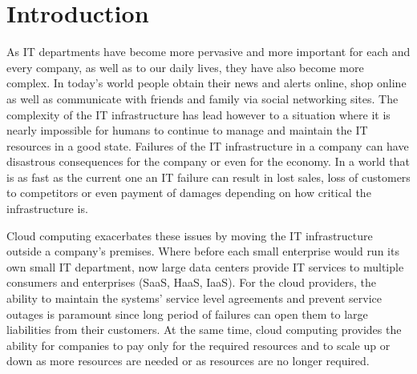 \documentclass[conference]{IEEEtran}
\begin{document}




%
\IEEEpeerreviewmaketitle



\section{Introduction}

As IT departments have become more pervasive and more important for each and every company, as well as to our daily lives, they have also become more complex. In today's world people obtain their news and alerts online, shop online as well as communicate with friends and family via social networking sites. The complexity of the IT infrastructure has lead however to a situation where it is nearly impossible for humans to continue to manage and maintain the IT resources in a good state. Failures of the IT infrastructure in a company can have disastrous consequences for the company or even for the economy. In a world that is as fast as the current one an IT failure can result in lost sales, loss of customers to competitors or even payment of damages depending on how critical the infrastructure is.

Cloud computing exacerbates these issues by moving the IT infrastructure outside a company's premises. Where before each small enterprise would run its own small IT department, now large data centers provide IT services to multiple consumers and enterprises (SaaS, HaaS, IaaS). For the cloud providers, the ability to maintain the systems' service level agreements and prevent service outages is paramount since long period of failures can open them to large liabilities from their customers. At the same time, cloud computing provides the ability for companies to pay only for the required resources and to scale up or down as more resources are needed or as resources are no longer required.
\end{document}
